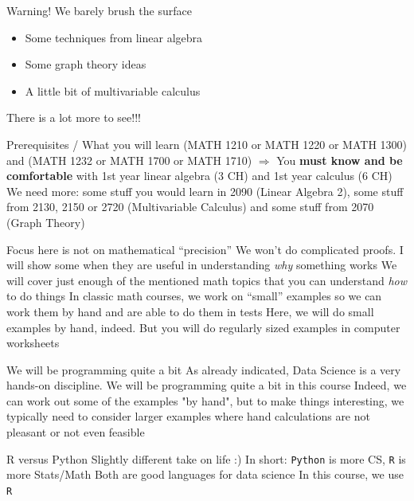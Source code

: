 \documentclass[aspectratio=169]{beamer}\usepackage[]{graphicx}\usepackage[]{xcolor}
\begin{document}
\begin{frame}{Warning! We barely brush the surface}
\begin{itemize}
\item Some techniques from linear algebra
\vfill
\item Some graph theory ideas
\vfill
\item A little bit of multivariable calculus
\end{itemize}
\vfill
There is a lot more to see!!!
\end{frame}

\begin{frame}{Prerequisites / What you will learn}
\bbullet (MATH 1210 or MATH 1220 or MATH 1300) and (MATH 1232 or MATH 1700 or MATH 1710)
\vfill
$\Rightarrow$ You \textbf{must know and be comfortable} with 1st year linear algebra (3 CH) and 1st year calculus (6 CH)
\vfill
\bbullet We need more: some stuff you would learn in 2090 (Linear Algebra 2), some stuff from 2130, 2150 or 2720 (Multivariable Calculus) and some stuff from 2070 (Graph Theory)
\end{frame}

\begin{frame}{Focus here is not on mathematical ``precision''}
\bbullet We won't do complicated proofs. I will show some when they are useful in understanding \textit{why} something works
\vfill
\bbullet We will cover just enough of the mentioned math topics that you can understand \textit{how} to do things
\vfill
\bbullet In classic math courses, we work on ``small'' examples so we can work them by hand and are able to do them in tests
\vfill
Here, we will do small examples by hand, indeed. But you will do regularly sized examples in computer worksheets
\end{frame}



\begin{frame}{We will be programming quite a bit}
As already indicated, Data Science is a very hands-on discipline. We will be programming quite a bit in this course
\vfill
Indeed, we can work out some of the examples "by hand", but to make things interesting, we typically need to consider larger examples where hand calculations are not pleasant or not even feasible
\end{frame}

\begin{frame}{R versus Python}
Slightly different take on life :)
\vfill
In short: \texttt{Python} is more CS, \texttt{R} is more Stats/Math
\vfill
Both are good languages for data science
\vfill
In this course, we use \texttt{R}
\end{frame}
\end{document}
